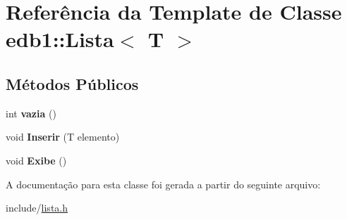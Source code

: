 \hypertarget{classedb1_1_1_lista}{}\section{Referência da Template de Classe edb1\+:\+:Lista$<$ T $>$}
\label{classedb1_1_1_lista}
\subsection*{Métodos Públicos}
\begin{DoxyCompactItemize}
\item 
\mbox{\label{classedb1_1_1_lista_a64d8571ca5b4b6e2762cc06413460d33}} 
int {\bfseries vazia} ()
\item 
\mbox{\label{classedb1_1_1_lista_a80468286882ecf08b45fb7bbfce71937}} 
void {\bfseries Inserir} (T elemento)
\item 
\mbox{\label{classedb1_1_1_lista_adbac42d42d967a7031f90696bcbbff42}} 
void {\bfseries Exibe} ()
\end{DoxyCompactItemize}


A documentação para esta classe foi gerada a partir do seguinte arquivo\+:\begin{DoxyCompactItemize}
\item 
include/\hyperlink{lista_8h}{lista.\+h}\end{DoxyCompactItemize}
